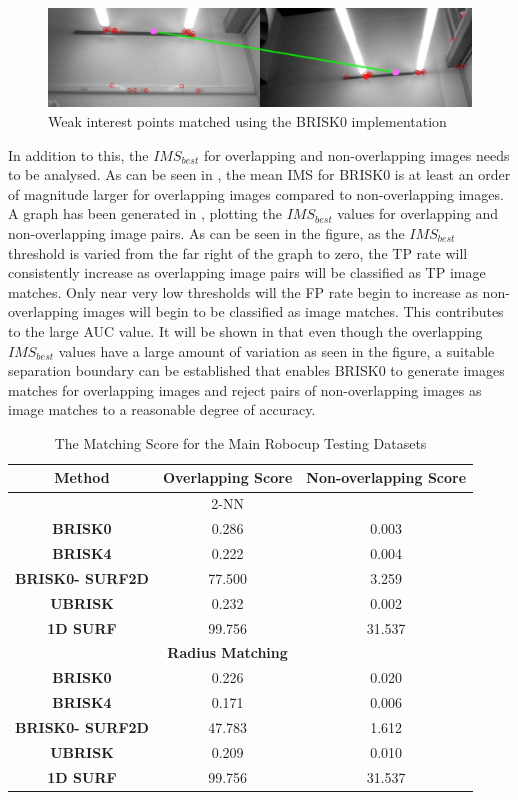  
\begin{figure}
  \centering
    \includegraphics[width=1.0\textwidth]{../Drawings/Matching/weakInterestPointMatch.jpg}
    \caption{Weak interest points matched using the BRISK0 implementation} 
    \label{fig:weakMatch}
\end{figure}

In addition to this, the $IMS_{best}$ for overlapping and non-overlapping images needs to be analysed. As can be seen in , the mean IMS for BRISK0 is at least an order of magnitude larger for overlapping images compared to non-overlapping images. A graph has been generated in , plotting the $IMS_{best}$ values for overlapping and non-overlapping image pairs. As can be seen in the figure, as the $IMS_{best}$ threshold is varied from the far right of the graph to zero, the TP rate will consistently increase as overlapping image pairs will be classified as TP image matches. Only near very low thresholds will the FP rate begin to increase as non-overlapping images will begin to be classified as image matches. This contributes to the large AUC value. It will be shown in  that even though the overlapping $IMS_{best}$ values have a large amount of variation as seen in the figure, a suitable separation boundary can be established that enables BRISK0 to generate images matches for overlapping images and reject pairs of non-overlapping images as image matches to a reasonable degree of accuracy.\\

\begin{table}
\centering
\caption{The Matching Score for the Main Robocup Testing Datasets}


\begin{tabular}{|c|c|c|}
\hline 
\textbf{Method} & \textbf{Overlapping Score} & \textbf{Non-overlapping Score}\tabularnewline
\hline 
\hline 
 & 2-NN & \tabularnewline
\hline 
\textbf{BRISK0} & 0.286 & 0.003\tabularnewline
\hline 
\textbf{BRISK4} & 0.222 & 0.004\tabularnewline
\hline 
\textbf{BRISK0- SURF2D} & 77.500 & 3.259\tabularnewline
\hline 
\textbf{UBRISK} & 0.232 & 0.002\tabularnewline
\hline 
\textbf{1D SURF} & 99.756 & 31.537\tabularnewline
\hline 
 & \textbf{Radius Matching} & \tabularnewline
\hline 
\textbf{BRISK0} & 0.226 & 0.020\tabularnewline
\hline 
\textbf{BRISK4} & 0.171 & 0.006\tabularnewline
\hline 
\textbf{BRISK0- SURF2D} & 47.783 & 1.612\tabularnewline
\hline 
\textbf{UBRISK} & 0.209 & 0.010\tabularnewline
\hline 
\textbf{1D SURF} & 99.756 & 31.537\tabularnewline
\hline 
\end{tabular}
\label{tab:ms_mrd}
\end{table}


